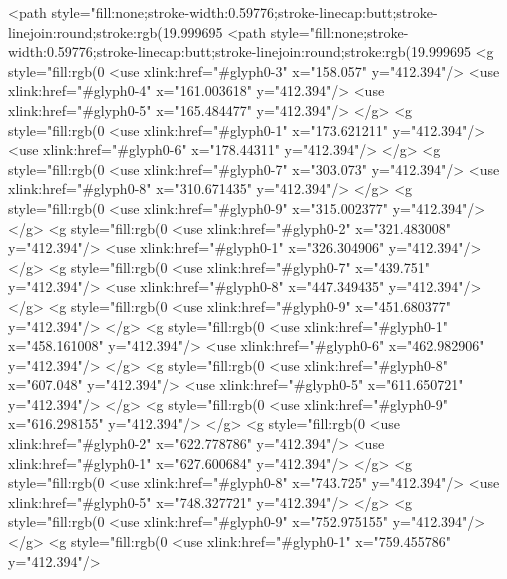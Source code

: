 <path style="fill:none;stroke-width:0.59776;stroke-linecap:butt;stroke-linejoin:round;stroke:rgb(19.999695%
<path style="fill:none;stroke-width:0.59776;stroke-linecap:butt;stroke-linejoin:round;stroke:rgb(19.999695%
<g style="fill:rgb(0%
  <use xlink:href="#glyph0-3" x="158.057" y="412.394"/>
  <use xlink:href="#glyph0-4" x="161.003618" y="412.394"/>
  <use xlink:href="#glyph0-5" x="165.484477" y="412.394"/>
</g>
<g style="fill:rgb(0%
  <use xlink:href="#glyph0-1" x="173.621211" y="412.394"/>
  <use xlink:href="#glyph0-6" x="178.44311" y="412.394"/>
</g>
<g style="fill:rgb(0%
  <use xlink:href="#glyph0-7" x="303.073" y="412.394"/>
  <use xlink:href="#glyph0-8" x="310.671435" y="412.394"/>
</g>
<g style="fill:rgb(0%
  <use xlink:href="#glyph0-9" x="315.002377" y="412.394"/>
</g>
<g style="fill:rgb(0%
  <use xlink:href="#glyph0-2" x="321.483008" y="412.394"/>
  <use xlink:href="#glyph0-1" x="326.304906" y="412.394"/>
</g>
<g style="fill:rgb(0%
  <use xlink:href="#glyph0-7" x="439.751" y="412.394"/>
  <use xlink:href="#glyph0-8" x="447.349435" y="412.394"/>
</g>
<g style="fill:rgb(0%
  <use xlink:href="#glyph0-9" x="451.680377" y="412.394"/>
</g>
<g style="fill:rgb(0%
  <use xlink:href="#glyph0-1" x="458.161008" y="412.394"/>
  <use xlink:href="#glyph0-6" x="462.982906" y="412.394"/>
</g>
<g style="fill:rgb(0%
  <use xlink:href="#glyph0-8" x="607.048" y="412.394"/>
  <use xlink:href="#glyph0-5" x="611.650721" y="412.394"/>
</g>
<g style="fill:rgb(0%
  <use xlink:href="#glyph0-9" x="616.298155" y="412.394"/>
</g>
<g style="fill:rgb(0%
  <use xlink:href="#glyph0-2" x="622.778786" y="412.394"/>
  <use xlink:href="#glyph0-1" x="627.600684" y="412.394"/>
</g>
<g style="fill:rgb(0%
  <use xlink:href="#glyph0-8" x="743.725" y="412.394"/>
  <use xlink:href="#glyph0-5" x="748.327721" y="412.394"/>
</g>
<g style="fill:rgb(0%
  <use xlink:href="#glyph0-9" x="752.975155" y="412.394"/>
</g>
<g style="fill:rgb(0%
  <use xlink:href="#glyph0-1" x="759.455786" y="412.394"/>

